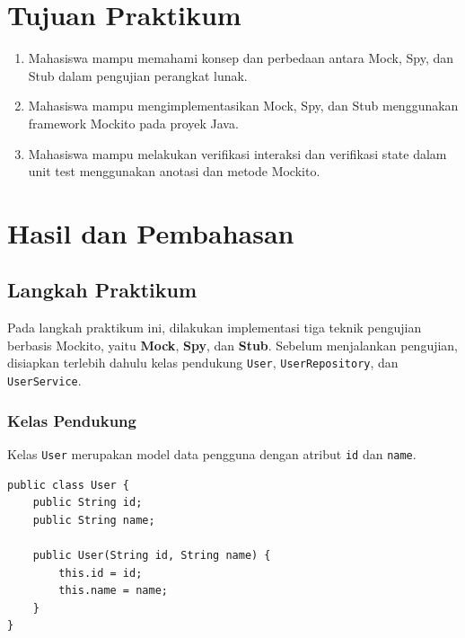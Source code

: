 \documentclass[a4paper,oneside,12pt]{report}
\newcommand{\tocboldsection}[1]{%
  \protect\renewcommand{\protect\cftchapfont}{\protect\bfseries}%
  #1%
  \protect\renewcommand{\protect\cftchapfont}{}%
}
\begin{document}
\chapter[Tujuan Praktikum]{Tujuan Praktikum}
\begin{enumerate}
   \item Mahasiswa mampu memahami konsep dan perbedaan antara Mock, Spy, dan Stub dalam pengujian perangkat lunak.
   \item Mahasiswa mampu mengimplementasikan Mock, Spy, dan Stub menggunakan framework Mockito pada proyek Java.
   \item Mahasiswa mampu melakukan verifikasi interaksi dan verifikasi state dalam unit test menggunakan anotasi dan metode Mockito.
\end{enumerate}
\clearpage

\chapter[\tocboldsection{Hasil dan Pembahasan}]{Hasil dan Pembahasan}

\section{Langkah Praktikum}

Pada langkah praktikum ini, dilakukan implementasi tiga teknik pengujian berbasis Mockito, yaitu \textbf{Mock}, \textbf{Spy}, dan \textbf{Stub}. Sebelum menjalankan pengujian, disiapkan terlebih dahulu kelas pendukung \texttt{User}, \texttt{UserRepository}, dan \texttt{UserService}.

\subsection{Kelas Pendukung}

Kelas \texttt{User} merupakan model data pengguna dengan atribut \texttt{id} dan \texttt{name}.

\begin{lstlisting}[style=javastyle, caption={User.java}]
public class User {
    public String id;
    public String name;

    public User(String id, String name) {
        this.id = id;
        this.name = name;
    }
}
\end{lstlisting}
\end{document}
